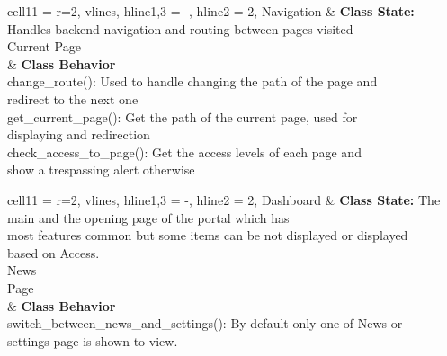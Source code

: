 \documentclass[11pt]{article}
\begin{document}
\begin{longtblr}[
  label = none,
  entry = none,
]{
  cell{1}{1} = {r=2}{},
  vlines,
  hline{1,3} = {-}{},
  hline{2} = {2}{},
}
Navigation & {\textbf{Class State: }Handles backend navigation and routing between pages visited\\
\hspace{\dimexpr\labelsep+0.5\tabcolsep}Current Page}\\
           & {\textbf{Class Behavior}\\
\hspace{\dimexpr\labelsep+0.5\tabcolsep}change\_route(): Used to handle changing
the path of the page and \\ redirect to the next one\\
\hspace{\dimexpr\labelsep+0.5\tabcolsep}get\_current\_page(): Get the path of the current
page, used for \\ displaying and redirection\\
\hspace{\dimexpr\labelsep+0.5\tabcolsep}check\_access\_to\_page(): Get the access levels of
each page and \\ show a trespassing alert otherwise}
\end{longtblr}

\begin{longtblr}[
  label = none,
  entry = none,
]{
  cell{1}{1} = {r=2}{},
  vlines,
  hline{1,3} = {-}{},
  hline{2} = {2}{},
}
Dashboard & {\textbf{Class State: }The main and the opening page of the portal which has \\most features
common but some items can be not displayed or displayed \\based on Access.\\
\hspace{\dimexpr\labelsep+0.5\tabcolsep}News\\
\hspace{\dimexpr\labelsep+0.5\tabcolsep}Page} \\
          & {\textbf{Class Behavior}\\\hspace{\dimexpr\labelsep+0.5\tabcolsep}switch\_between\_news\_and\_settings():
By default only one of News or\\ settings page is shown to view.}
\end{longtblr}
\end{document}
